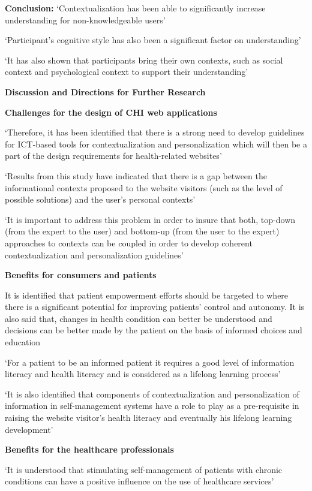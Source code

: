 \documentclass[]{article}
\begin{document}
\textbf{Conclusion:} ‘Contextualization has been able to significantly increase understanding for non-knowledgeable users’

‘Participant’s cognitive style has also been a significant factor on understanding’

‘It has also shown that participants bring their own contexts, such as social context and psychological context to support their understanding’

\textbf{Discussion and Directions for Further Research}

\textbf{Challenges for the design of CHI web applications}

‘Therefore, it has been identified that there is a strong need to develop guidelines for ICT-based tools for contextualization and personalization which will then be a part of the design requirements for health-related websites’

‘Results from this study have indicated that there is a gap between the informational contexts proposed to the website visitors (such as the level of possible solutions) and the user’s personal contexts’

‘It is important to address this problem in order to insure that both, top-down (from the expert to the user) and bottom-up (from the user to the expert) approaches to contexts can be coupled in order to develop coherent contextualization and personalization guidelines’

\textbf{Benefits for consumers and patients}

It is identified that patient empowerment efforts should be targeted to where there is a significant potential for improving patients’ control and autonomy. It is also said that, changes in health condition can better be understood and decisions can be better made by the patient on the basis of informed choices and education

‘For a patient to be an informed patient it requires a good level of information literacy and health literacy and is considered as a lifelong learning process’

‘It is also identified that components of contextualization and personalization of information in self-management systems have a role to play as a pre-requisite in raising the website visitor’s health literacy and eventually his lifelong learning development’

\textbf{Benefits for the healthcare professionals}

‘It is understood that stimulating self-management of patients with chronic conditions can have a positive influence on the use of healthcare services’
\end{document}

